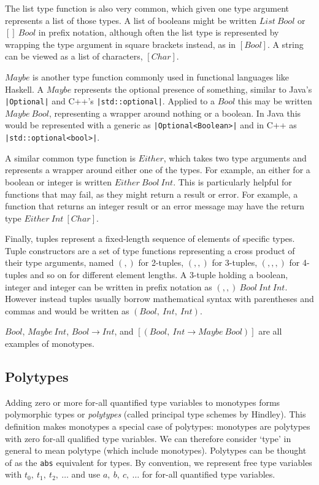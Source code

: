 \documentclass[a4paper,fleqn,oneside,12pt]{report}
\begin{document}
The list type function is also very common, which given one type argument represents a list of those types. A list of booleans might be written $List\ Bool$ or $[]\ Bool$ in prefix notation, although often the list type is represented by wrapping the type argument in square brackets instead, as in $[Bool]$. A string can be viewed as a list of characters, $[Char]$.

$Maybe$ is another type function commonly used in functional languages like Haskell. A $Maybe$ represents the optional presence of something, similar to Java’s \texttt{|Optional|} and C++’s \texttt{|std::optional|}. Applied to a $Bool$ this may be written $Maybe\ Bool$, representing a wrapper around nothing or a boolean. In Java this would be represented with a generic as \texttt{|Optional<Boolean>|} and in C++ as \texttt{|std::optional<bool>|}.

A similar common type function is $Either$, which takes two type arguments and represents a wrapper around either one of the types. For example, an either for a boolean or integer is written $Either\ Bool\ Int$. This is particularly helpful for functions that may fail, as they might return a result or error. For example, a function that returns an integer result or an error message may have the return type $Either\ Int\ [Char]$.

Finally, tuples represent a fixed-length sequence of elements of specific types. Tuple constructors are a set of type functions representing a cross product of their type arguments, named $(,)$ for 2-tuples, $(,,)$ for 3-tuples, $(,,,)$ for 4-tuples and so on for different element lengths. A 3-tuple holding a boolean, integer and integer can be written in prefix notation as $(,,)\ Bool\ Int\ Int$. However instead tuples usually borrow mathematical syntax with parentheses and commas and would be written as $(Bool,\ Int,\ Int)$.

$Bool$, $Maybe\ Int$, $Bool \rightarrow Int$, and $[(Bool,\ Int \rightarrow Maybe\ Bool)]$ are all examples of monotypes.

\subsection{Polytypes}

Adding zero or more for-all quantified type variables to monotypes forms polymorphic types or \textit{polytypes} (called principal type schemes by Hindley). This definition makes monotypes a special case of polytypes: monotypes are polytypes with zero for-all qualified type variables. We can therefore consider `type' in general to mean polytype (which include monotypes). Polytypes can be thought of as the \texttt{abs} equivalent for types. By convention, we represent free type variables with $t_0,\ t_1,\ t_2,\ \dots$ and use $a,\ b,\ c,\ \dots$ for for-all quantified type variables.
\end{document}
